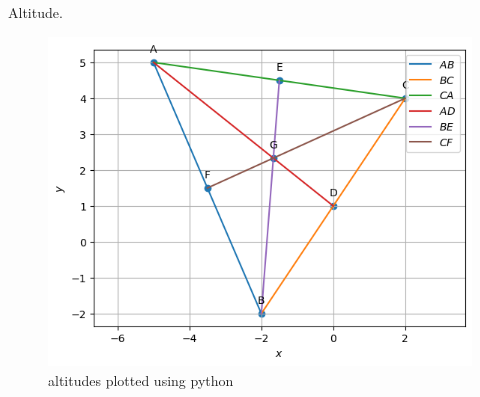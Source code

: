 \begin{table}[H]
        \centering
        
        \caption{Altitude.}
        \label{tab:Altitude}
    \end{table}
\begin{figure}[H]
\includegraphics[width=\columnwidth]{median/figs/median.png}
\caption{altitudes plotted using python}
\label{fig:i_altitude_py}
\end{figure}

